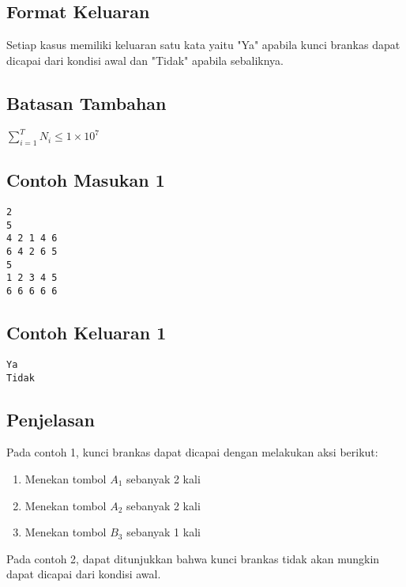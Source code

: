 \documentclass{article}
\begin{document}
\subsection*{Format Keluaran}

Setiap kasus memiliki keluaran satu kata yaitu "Ya" apabila kunci brankas dapat dicapai dari kondisi awal dan "Tidak" apabila sebaliknya.

\subsection*{Batasan Tambahan}
$\sum_{i=1}^T N_i \leq 1 \times 10^{7}$

\begin{multicols}{2}
\subsection*{Contoh Masukan 1}
\begin{lstlisting}
2
5
4 2 1 4 6
6 4 2 6 5
5
1 2 3 4 5
6 6 6 6 6
\end{lstlisting}
\columnbreak
\subsection*{Contoh Keluaran 1}
\begin{lstlisting}
Ya
Tidak
\end{lstlisting}
\vfill
\null
\end{multicols}


\subsection*{Penjelasan}

Pada contoh 1, kunci brankas dapat dicapai dengan melakukan aksi berikut:

\begin{enumerate}
\item Menekan tombol $A_1$ sebanyak 2 kali
\item Menekan tombol $A_2$ sebanyak 2 kali
\item Menekan tombol $B_3$ sebanyak 1 kali
\end{enumerate}

Pada contoh 2, dapat ditunjukkan bahwa kunci brankas tidak akan mungkin dapat dicapai dari kondisi awal.
\end{document}
